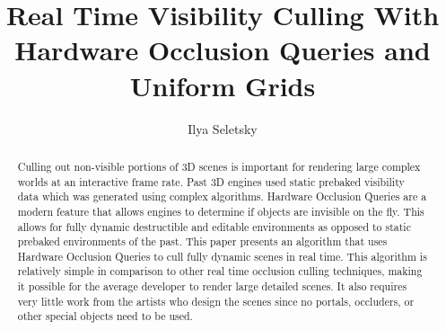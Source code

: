 \documentclass[12pt]{ucthesis}
\begin{document}

\title{Real Time Visibility Culling With Hardware Occlusion Queries and Uniform Grids}
\author{Ilya Seletsky}
  
 
     

\maketitle

\begin{frontmatter}

\copyrightpage

\committeemembershippage

\begin{abstract}

Culling out non-visible portions of 3D scenes is important for rendering large complex worlds at an interactive frame rate.
Past 3D engines used static prebaked visibility data which was generated using complex algorithms.
Hardware Occlusion Queries are a modern feature that allows engines to determine if objects are invisible on the fly.
This allows for fully dynamic destructible and editable environments as opposed to static prebaked environments of the past.
This paper presents an algorithm that uses Hardware Occlusion Queries to cull fully dynamic scenes in real time.
This algorithm is relatively simple in comparison to other real time occlusion culling techniques, making it possible for the average developer to render large detailed scenes.
It also requires very little work from the artists who design the scenes since no portals, occluders, or other special objects need to be used.

\end{abstract}





\tableofcontents


\listoftables

\listoffigures

\end{frontmatter}
\end{document}
